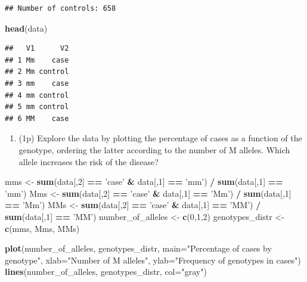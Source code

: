 \documentclass[
]{article}
\newenvironment{Shaded}{\begin{snugshade}}{\end{snugshade}}
\newcommand{\DataTypeTok}[1]{\textcolor[rgb]{0.13,0.29,0.53}{#1}}
\newcommand{\DecValTok}[1]{\textcolor[rgb]{0.00,0.00,0.81}{#1}}
\newcommand{\KeywordTok}[1]{\textcolor[rgb]{0.13,0.29,0.53}{\textbf{#1}}}
\newcommand{\NormalTok}[1]{#1}
\newcommand{\OperatorTok}[1]{\textcolor[rgb]{0.81,0.36,0.00}{\textbf{#1}}}
\newcommand{\StringTok}[1]{\textcolor[rgb]{0.31,0.60,0.02}{#1}}
\providecommand{\tightlist}{%
  \setlength{\itemsep}{0pt}\setlength{\parskip}{0pt}}
\begin{document}
\begin{verbatim}
## Number of controls: 658
\end{verbatim}

\begin{Shaded}
\begin{Highlighting}[]
\KeywordTok{head}\NormalTok{(data)}
\end{Highlighting}
\end{Shaded}

\begin{verbatim}
##   V1      V2
## 1 Mm    case
## 2 Mm control
## 3 mm    case
## 4 mm control
## 5 mm control
## 6 MM    case
\end{verbatim}

\begin{enumerate}
\def\labelenumi{\arabic{enumi}.}
\setcounter{enumi}{1}
\tightlist
\item
  (1p) Explore the data by plotting the percentage of cases as a
  function of the genotype, ordering the latter according to the number
  of M alleles. Which allele increases the risk of the disease?
\end{enumerate}

\begin{Shaded}
\begin{Highlighting}[]
\NormalTok{mms <-}\StringTok{ }\KeywordTok{sum}\NormalTok{(data[,}\DecValTok{2}\NormalTok{] }\OperatorTok{==}\StringTok{ 'case'} \OperatorTok{&}\StringTok{ }\NormalTok{data[,}\DecValTok{1}\NormalTok{] }\OperatorTok{==}\StringTok{ 'mm'}\NormalTok{) }\OperatorTok{/}\StringTok{ }\KeywordTok{sum}\NormalTok{(data[,}\DecValTok{1}\NormalTok{] }\OperatorTok{==}\StringTok{ 'mm'}\NormalTok{)}
\NormalTok{Mms <-}\StringTok{ }\KeywordTok{sum}\NormalTok{(data[,}\DecValTok{2}\NormalTok{] }\OperatorTok{==}\StringTok{ 'case'} \OperatorTok{&}\StringTok{ }\NormalTok{data[,}\DecValTok{1}\NormalTok{] }\OperatorTok{==}\StringTok{ 'Mm'}\NormalTok{) }\OperatorTok{/}\StringTok{ }\KeywordTok{sum}\NormalTok{(data[,}\DecValTok{1}\NormalTok{] }\OperatorTok{==}\StringTok{ 'Mm'}\NormalTok{)}
\NormalTok{MMs <-}\StringTok{ }\KeywordTok{sum}\NormalTok{(data[,}\DecValTok{2}\NormalTok{] }\OperatorTok{==}\StringTok{ 'case'} \OperatorTok{&}\StringTok{ }\NormalTok{data[,}\DecValTok{1}\NormalTok{] }\OperatorTok{==}\StringTok{ 'MM'}\NormalTok{) }\OperatorTok{/}\StringTok{ }\KeywordTok{sum}\NormalTok{(data[,}\DecValTok{1}\NormalTok{] }\OperatorTok{==}\StringTok{ 'MM'}\NormalTok{)}
\NormalTok{number_of_alleles <-}\StringTok{ }\KeywordTok{c}\NormalTok{(}\DecValTok{0}\NormalTok{,}\DecValTok{1}\NormalTok{,}\DecValTok{2}\NormalTok{)}
\NormalTok{genotypes_distr <-}\StringTok{ }\KeywordTok{c}\NormalTok{(mms, Mms, MMs)}

\KeywordTok{plot}\NormalTok{(number_of_alleles, genotypes_distr, }\DataTypeTok{main=}\StringTok{"Percentage of cases by genotype"}\NormalTok{, }\DataTypeTok{xlab=}\StringTok{"Number of M alleles"}\NormalTok{, }\DataTypeTok{ylab=}\StringTok{"Frequency of genotypes in cases"}\NormalTok{)}
\KeywordTok{lines}\NormalTok{(number_of_alleles, genotypes_distr, }\DataTypeTok{col=}\StringTok{"gray"}\NormalTok{)}
\end{Highlighting}
\end{Shaded}
\end{document}
